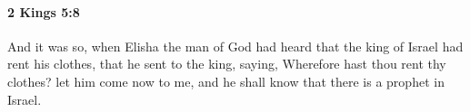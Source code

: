 
		\paragraph{2 Kings 5:8} %
			\label{2KINGS-5-8}

			And it was so, when Elisha the man of God had heard that the king of Israel had rent his clothes, that he sent to the king, saying, Wherefore hast thou rent thy clothes? let him come now to me, and he shall know that there is a prophet in Israel.


